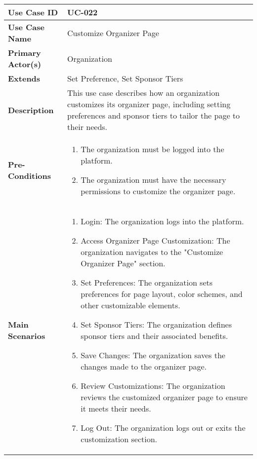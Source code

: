 \begin{table}[!ht]
    \centering
    \renewcommand{\arraystretch}{1.3} %
    \begin{tabularx}{\textwidth}{|l|X|}
        \hline
        \textbf{Use Case ID} & UC-022 \\
        \hline
        \textbf{Use Case Name} & Customize Organizer Page \\
        \hline
        \textbf{Primary Actor(s)} & Organization \\
        \hline
        \textbf{Extends} & Set Preference, Set Sponsor Tiers \\
        \hline
        \textbf{Description} & This use case describes how an organization customizes its organizer page, including setting preferences and sponsor tiers to tailor the page to their needs. \\
        \hline
        \textbf{Pre-Conditions} & 
        \begin{enumerate}[label=\arabic*.,itemsep=0pt]
            \item The organization must be logged into the platform.
            \item The organization must have the necessary permissions to customize the organizer page.
        \end{enumerate} \\
        \hline
        \textbf{Main Scenarios} & 
        \begin{enumerate}[label=\arabic*.,itemsep=0pt]
            \item Login: The organization logs into the platform.
            \item Access Organizer Page Customization: The organization navigates to the "Customize Organizer Page" section.
            \item Set Preferences: The organization sets preferences for page layout, color schemes, and other customizable elements.
            \item Set Sponsor Tiers: The organization defines sponsor tiers and their associated benefits.
            \item Save Changes: The organization saves the changes made to the organizer page.
            \item Review Customizations: The organization reviews the customized organizer page to ensure it meets their needs.
            \item Log Out: The organization logs out or exits the customization section.
        \end{enumerate} \\

\end{tabularx}
\end{table}
